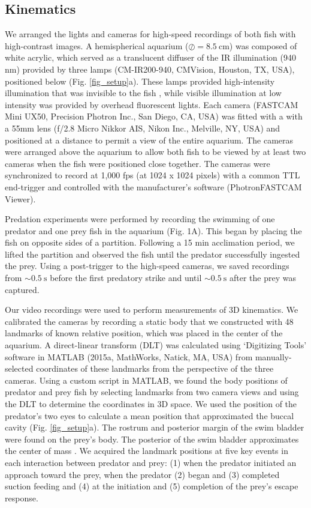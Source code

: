 \documentclass[]{rsos}%
\begin{document}
\subsection{Kinematics}
We arranged the lights and cameras for high-speed recordings of both fish with high-contrast images. 
A hemispherical aquarium ($\oslash = \SI{8.5}{\cm}$) was composed of white acrylic, which served as a translucent diffuser of the IR illumination (940 nm) provided by three lamps (CM-IR200-940, CMVision, Houston, TX, USA), positioned below (Fig. \ref{fig_setup}a). 
These lamps provided high-intensity illumination that was invisible to the fish \cite{Robinson:1993tu}, while visible illumination at low intensity was provided by overhead fluorescent lights.
Each camera (FASTCAM Mini UX50, Precision Photron Inc., San Diego, CA, USA) was fitted with a with a 55mm lens (f/2.8 Micro Nikkor AIS, Nikon Inc., Melville, NY, USA) and positioned at a distance to permit a view of the entire aquarium. 
The cameras were arranged above the aquarium to allow both fish to be viewed by at least two cameras when the fish were positioned close together.
The cameras were synchronized to record at 1,000 fps (at 1024 x 1024 pixels) with a common TTL end-trigger and controlled with the manufacturer's software (PhotronFASTCAM Viewer).

Predation experiments were performed by recording the swimming of one predator and one prey fish in the aquarium (Fig. 1A). 
This began by placing the fish on opposite sides of a partition.
Following a 15 min acclimation period, we lifted the partition and observed the fish until the predator successfully ingested the prey.
Using a post-trigger to the high-speed cameras, we saved recordings from $\sim \SI{0.5}{\s}$ before the first predatory strike and until $\sim \SI{0.5}{\s}$  after the prey was captured.

Our video recordings were used to perform measurements of 3D kinematics. 
We calibrated the cameras by recording a static body that we constructed with 48 landmarks of known relative position, which was placed in the center of the aquarium.
A direct-linear transform (DLT) was calculated using `Digitizing Tools' software in MATLAB (2015a, MathWorks, Natick, MA, USA) \cite{Hedrick:2008wz} from manually-selected coordinates of these landmarks from the perspective of the three cameras.
Using a custom script in MATLAB, we found the body positions of predator and prey fish by selecting landmarks from two camera views and using the DLT to determine the coordinates in 3D space.
We used the position of the predator's two eyes to calculate a mean position that approximated the buccal cavity (Fig. \ref{fig_setup}a).
The rostrum and posterior margin of the swim bladder were found on the prey's body. 
The posterior of the swim bladder approximates the center of mass \cite{Stewart:2010ig}.
We acquired the landmark positions at five key events in each interaction between predator and prey: (1) when the predator initiated an approach toward the prey, when the predator (2) began and (3) completed suction feeding and (4) at the initiation and (5) completion of the prey's escape response.
\end{document}
